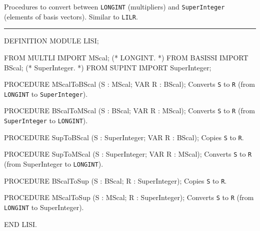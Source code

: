 
Procedures to convert between {\tt LONGINT} (multipliers) and
{\tt SuperInteger} (elements of basis vectors).
Similar to {\tt LILR}.

\bigskip\hrule
\code

DEFINITION MODULE LISI;

FROM MULTLI  IMPORT MScal;             (* LONGINT.                        *)
FROM BASISSI IMPORT BScal;             (* SuperInteger.                   *)
FROM SUPINT  IMPORT SuperInteger;

PROCEDURE MScalToBScal (S : MScal;  VAR R : BScal);
\endcode
  \tab  Converts {\tt S} to {\tt R}
   (from {\tt LONGINT} to {\tt SuperInteger}).\endtab
\code

PROCEDURE BScalToMScal (S : BScal;  VAR R : MScal);
\endcode
  \tab  Converts {\tt S} to {\tt R}
   (from {\tt SuperInteger} to {\tt LONGINT}).\endtab
\code

PROCEDURE SupToBScal (S : SuperInteger;  VAR R : BScal);
\endcode
  \tab Copies {\tt S} to {\tt R}.\endtab
\code

PROCEDURE SupToMScal (S : SuperInteger;  VAR R : MScal);
\endcode
  \tab Converts {\tt S} to {\tt R}
   (from SuperInteger to {\tt LONGINT}).\endtab
\code

PROCEDURE BScalToSup (S : BScal;  R : SuperInteger);
\endcode
  \tab Copies {\tt S} to {\tt R}.\endtab
\code

PROCEDURE MScalToSup (S : MScal;  R : SuperInteger);
\endcode
  \tab Converts {\tt S} to {\tt R}
   (from {\tt LONGINT} to SuperInteger).\endtab
\code

END LISI.
\endcode
